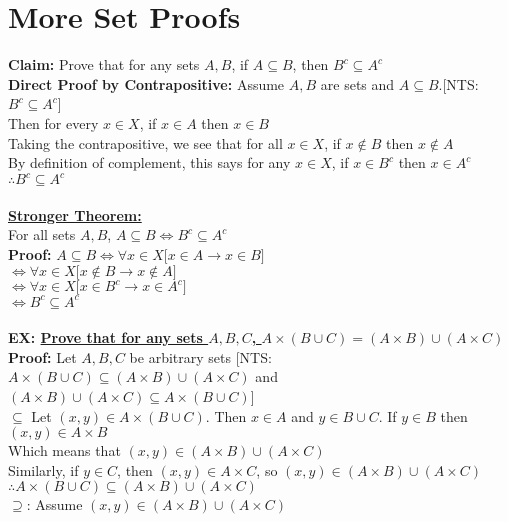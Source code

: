 \documentclass{article}
\begin{document}
		\section[04/05/18]{More Set Proofs}
		\textbf{Claim:} Prove that for any sets $A,B$, if $A\subseteq B$, then $B^c\subseteq A^c$\\
		\textbf{Direct Proof by Contrapositive:} Assume $A,B$ are sets and $A\subseteq B$.[NTS: $B^c\subseteq A^c$]\\
		Then for every $x\in X$, if $x\in A$ then $x\in B$\\
		Taking the contrapositive, we see that for all $x\in X$, if $x\notin B$ then $x\notin A$\\
		By definition of complement, this says for any $x\in X$, if $x\in B^c$ then $x\in A^c$\\
		$\therefore B^c\subseteq A^c$\\ \\
		\textbf{\underline{Stronger Theorem:}}\\
		For all sets $A,B$, $A\subseteq B \iff B^c\subseteq A^c$\\
		\textbf{Proof:} $A\subseteq B \iff \forall x\in X\lbrack x\in A \rightarrow x\in B\rbrack$\\
		$\iff \forall x\in X\lbrack x\notin B \rightarrow x\notin A\rbrack$\\
		$\iff \forall x\in X\lbrack x\in B^c \rightarrow x\in A^c\rbrack$\\
		$\iff B^c\subseteq A^c$\\ \\
		\textbf{EX: \underline{Prove that for any sets $A,B,C$, $A\times (B\cup C) = (A\times B)\cup (A\times C)$}}\\
		\textbf{Proof:} Let $A,B,C$ be arbitrary sets [NTS: $A\times (B\cup C)\subseteq(A\times B)\cup (A\times C)$ and $(A\times B)\cup (A\times C) \subseteq A\times (B\cup C)$]\\
 		\underline{$\subseteq$} Let $(x,y)\in A\times(B\cup C)$. Then $x\in A$ and $y\in B\cup C$. If $y\in B$ then $(x,y)\in A\times B$\\
 		Which means that $(x,y)\in (A\times B)\cup (A\times C)$\\
 		Similarly, if $y\in C$, then $(x,y)\in A\times C$, so $(x,y)\in(A\times B)\cup(A\times C)$\\
 		$\therefore A\times(B\cup C)\subseteq(A\times B)\cup(A\times C)$\\
 		\underline{$\supseteq$}: Assume $(x,y)\in (A\times B)\cup (A\times C)$\\
\end{document}
